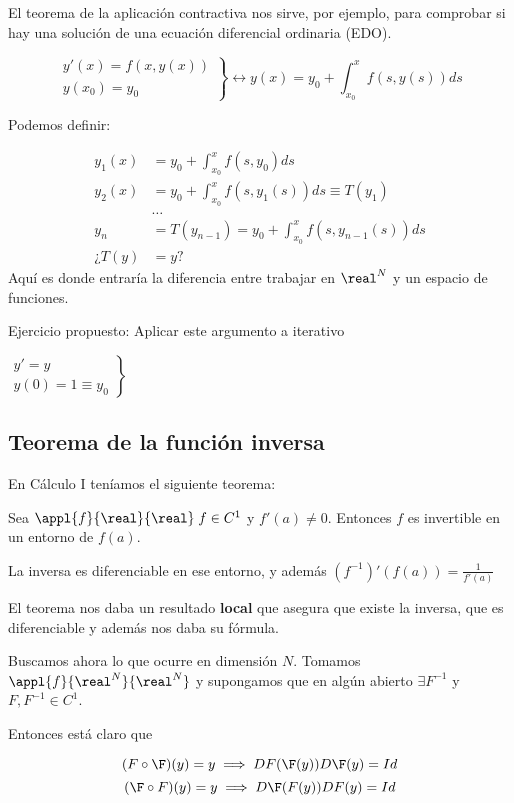 El teorema de la aplicación contractiva nos sirve, por ejemplo, para comprobar si hay una solución de una ecuación diferencial ordinaria (EDO).

$$\left.\begin{matrix}y'(x) = f(x,y(x))\\
        y(x_0) = y_0
       \end{matrix}\right\} \leftrightarrow y(x) = y_0 + \int_{x_0}^x f(s,y(s)) ds$$

Podemos definir:

\begin{align*}
y_1(x) &= y_0 + \int_{x_0}^{x} f(s,y_0)ds\\
y_2(x) &= y_0 + \int_{x_0}^x f(s,y_1(s))ds \equiv T(y_1)\\
&\dots\\
y_n &= T(y_{n-1}) =  y_0 + \int_{x_0}^x f(s,y_{n-1}(s))ds\\
¿T(y) &= y?
\end{align*}
Aquí es donde entraría la diferencia entre trabajar en $\real^N$ y un espacio de funciones.

Ejercicio propuesto: Aplicar este argumento a iterativo

$\left. \begin{matrix} y' = y\\
         y(0) = 1 \equiv y_0
        \end{matrix}\right\}$

        
\subsection{Teorema de la función inversa}
En Cálculo I teníamos el siguiente teorema:
\begin{theorem} Sea $\appl{f}{\real}{\real}\; f\in C^1$ y $f'(a) \neq 0$. Entonces $f$ es invertible en un entorno de $f(a)$. 

La inversa es diferenciable en ese entorno, y además $(f^{-1})'(f(a)) = \frac{1}{f'(a)}$
\end{theorem}

El teorema nos daba un resultado \textbf{local} que asegura que existe la inversa, que es diferenciable y además nos daba su fórmula. 

Buscamos ahora lo que ocurre en dimensión $N$. Tomamos $\appl{f}{\real^N}{\real^N}$ y supongamos que en algún abierto $\exists F^{-1}$ y $F,F^{-1} \in  C^1$.

Entonces está claro que

\[ (F\circ \F)(y) = y \implies DF(\F(y))D\F(y) = Id \]
\[ (\F\circ F)(y) = y \implies D\F(F(y))DF(y) = Id \]

